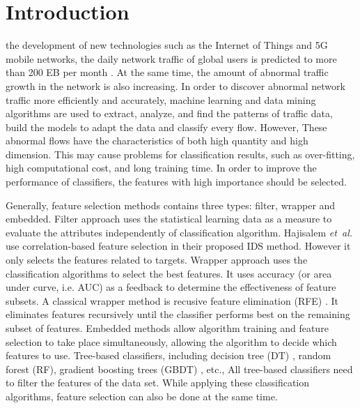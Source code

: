 \documentclass{ieeeaccess}
\theoremstyle{definition}
\begin{document}
\titlepgskip=-15pt

\maketitle


\section{Introduction}
\label{sec:introduction}

 the development of new technologies such as the Internet of Things and 5G mobile networks, the daily network traffic of global users is predicted to more than 200 EB per month \cite{cisco-report}. 
At the same time, the amount of abnormal traffic growth in the network is also increasing. 
In order to discover abnormal network traffic more efficiently and accurately, machine learning and data mining algorithms are used to extract, analyze, and find the patterns of traffic data, build the models to adapt the data and classify every flow. 
However, These abnormal flows have the characteristics of both high quantity and high dimension. This may cause problems for classification results, such as over-fitting, high computational cost, and long training time. In order to improve the performance of classifiers, the features with high importance should be selected.

Generally, feature selection methods contains three types: filter, wrapper and embedded. Filter approach uses the statistical learning data as a measure to evaluate the attributes independently of classification algorithm\cite{Maza2018}. Hajisalem \emph{et~al.} \cite{Hajisalem2018} use correlation-based feature selection in their proposed IDS method. However it only selects the features related to targets. 
Wrapper approach uses the classification algorithms to select the best features. It uses accuracy (or area under curve, i.e. AUC) as a feedback to determine the effectiveness of feature subsets. A classical wrapper method is recusive feature elimination (RFE) \cite{RFE2002}. It eliminates features recursively until the classifier performs best on the remaining subset of features. 
Embedded methods allow algorithm training and feature selection to take place simultaneously, allowing the algorithm to decide which features to use. Tree-based classifiers, including decision tree (DT) \cite{quinlan2014c4}, random forest (RF)\cite{rf2002}, gradient boosting trees (GBDT) \cite{gbdt2001}, etc., All tree-based classifiers need to filter the features of the data set. While applying these classification algorithms, feature selection can also be done at the same time.
\end{document}
